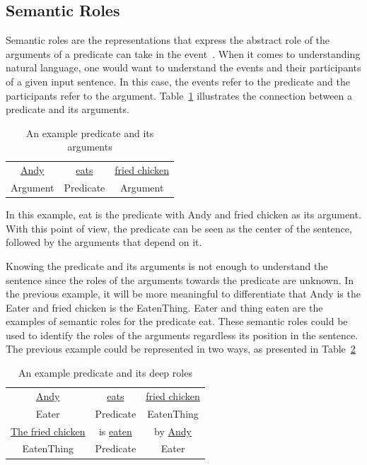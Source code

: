 \subsection{Semantic Roles}
Semantic roles are the representations that express the abstract role of the arguments of a predicate can take in the event~\citep{jurafsky2000speech}. When it comes to understanding natural language, one would want to understand the events and their participants of a given input sentence. In this case, the events refer to the predicate and the participants refer to the argument. Table~\ref{tab:examplesrl1} illustrates the connection between a predicate and its arguments.

\begin{table}
	\centering
	\caption{An example predicate and its arguments}
	\label{tab:examplesrl1}
	\begin{tabular}{|ccc|}
		\hline
		\underline{Andy} & \underline{eats} & \underline{fried chicken} \\
		Argument & Predicate & Argument \\
		\hline
	\end{tabular}
\end{table}

In this example, eat is the predicate with Andy and fried chicken as its argument. With this point of view, the predicate can be seen as the center of the sentence, followed by the arguments that depend on it.

Knowing the predicate and its arguments is not enough to understand the sentence since the roles of the arguments towards the predicate are unknown. In the previous example, it will be more meaningful to differentiate that Andy is the Eater and fried chicken is the EatenThing. Eater and thing eaten are the examples of semantic roles for the predicate eat. These semantic roles could be used to identify the roles of the arguments regardless its position in the sentence. The previous example could be represented in two ways, as presented in Table~\ref{tab:examplesrl2}

\begin{table}
	\centering
	\caption{An example predicate and its deep roles}
	\label{tab:examplesrl2}
	\begin{tabular}{|ccc|}
		\hline
		\underline{Andy} & \underline{eats} & \underline{fried chicken} \\
		Eater & Predicate & EatenThing \\
		\hline
		\underline{The fried chicken} & is \underline{eaten} & by \underline{Andy} \\
		EatenThing & Predicate &  Eater \\
		\hline
	\end{tabular}
\end{table}

